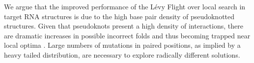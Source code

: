 
We argue that the improved performance of the Lévy Flight over local search in target RNA structures is due to the high base pair density of pseudoknotted structures. Given that pseudoknots present a high density of interactions, there are dramatic increases in possible incorrect folds and thus becoming trapped near local optima \cite{hajdin2013accurate}. Large numbers of mutations in paired positions, as implied by a heavy tailed distribution, are necessary to explore radically different solutions. 

